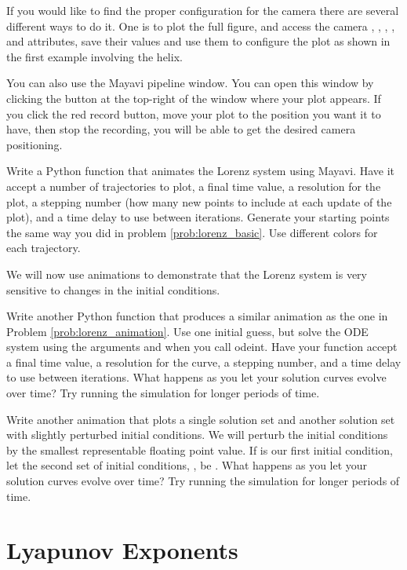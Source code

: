 If you would like to find the proper configuration for the camera there are several different ways to do it.
One is to plot the full figure, and access the camera , , , , and  attributes, save their values and use them to configure the plot as shown in the first example involving the helix.

You can also use the Mayavi pipeline window.
You can open this window by clicking the button at the top-right of the window where your plot appears.
If you click the red record button, move your plot to the position you want it to have, then stop the recording, you will be able to get the desired camera positioning.

\begin{problem}
\label{prob:lorenz_animation}
Write a Python function that animates the Lorenz system using Mayavi.
Have it accept a number of trajectories to plot, a final time value, a resolution for the plot, a stepping number (how many new points to include at each update of the plot), and a time delay to use between iterations.
Generate your starting points the same way you did in problem \ref{prob:lorenz_basic}.
Use different colors for each trajectory.
\end{problem}

We will now use animations to demonstrate that the Lorenz system is very sensitive to changes in the initial conditions.

\begin{problem}
\label{prob:lorenz_tol_sensitivity}
Write another Python function that produces a similar animation as the one in Problem \ref{prob:lorenz_animation}.
Use one initial guess, but solve the ODE system using the arguments  and  when you call odeint.
Have your function accept a final time value, a resolution for the curve, a stepping number, and a time delay to use between iterations.
What happens as you let your solution curves evolve over time?
Try running the simulation for longer periods of time.
\end{problem}

\begin{problem}
Write another animation that plots a single solution set and another solution set with slightly perturbed initial conditions.
We will perturb the initial conditions by the smallest representable floating point value.
If  is our first initial condition, let the second set of initial conditions, , be .
What happens as you let your solution curves evolve over time?
Try running the simulation for longer periods of time.
\end{problem}

\section*{Lyapunov Exponents}
